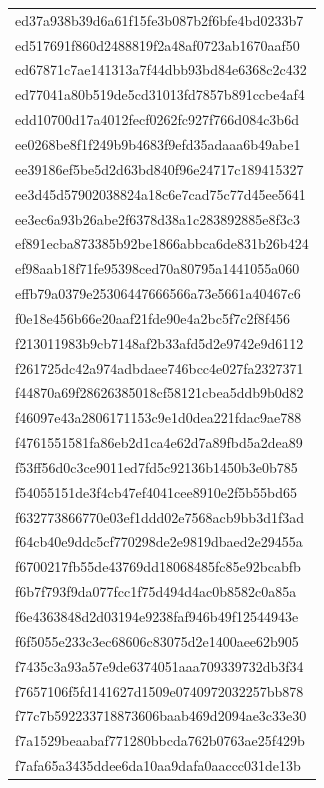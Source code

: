 \begin{tabular}{l}
ed37a938b39d6a61f15fe3b087b2f6bfe4bd0233b7 \\
ed517691f860d2488819f2a48af0723ab1670aaf50 \\
ed67871c7ae141313a7f44dbb93bd84e6368c2c432 \\
ed77041a80b519de5cd31013fd7857b891ccbe4af4 \\
edd10700d17a4012fecf0262fc927f766d084c3b6d \\
ee0268be8f1f249b9b4683f9efd35adaaa6b49abe1 \\
ee39186ef5be5d2d63bd840f96e24717c189415327 \\
ee3d45d57902038824a18c6e7cad75c77d45ee5641 \\
ee3ec6a93b26abe2f6378d38a1c283892885e8f3c3 \\
ef891ecba873385b92be1866abbca6de831b26b424 \\
ef98aab18f71fe95398ced70a80795a1441055a060 \\
effb79a0379e25306447666566a73e5661a40467c6 \\
f0e18e456b66e20aaf21fde90e4a2bc5f7c2f8f456 \\
f213011983b9cb7148af2b33afd5d2e9742e9d6112 \\
f261725dc42a974adbdaee746bcc4e027fa2327371 \\
f44870a69f28626385018cf58121cbea5ddb9b0d82 \\
f46097e43a2806171153c9e1d0dea221fdac9ae788 \\
f4761551581fa86eb2d1ca4e62d7a89fbd5a2dea89 \\
f53ff56d0c3ce9011ed7fd5c92136b1450b3e0b785 \\
f54055151de3f4cb47ef4041cee8910e2f5b55bd65 \\
f632773866770e03ef1ddd02e7568acb9bb3d1f3ad \\
f64cb40e9ddc5cf770298de2e9819dbaed2e29455a \\
f6700217fb55de43769dd18068485fc85e92bcabfb \\
f6b7f793f9da077fcc1f75d494d4ac0b8582c0a85a \\
f6e4363848d2d03194e9238faf946b49f12544943e \\
f6f5055e233c3ec68606c83075d2e1400aee62b905 \\
f7435c3a93a57e9de6374051aaa709339732db3f34 \\
f7657106f5fd141627d1509e0740972032257bb878 \\
f77c7b592233718873606baab469d2094ae3c33e30 \\
f7a1529beaabaf771280bbcda762b0763ae25f429b \\
f7afa65a3435ddee6da10aa9dafa0aaccc031de13b \\

\end{tabular}
